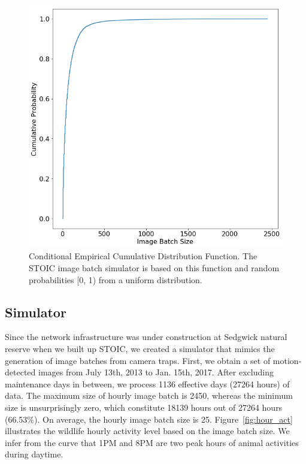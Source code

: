  
\begin{figure}[t] \centering 
\includegraphics[scale=0.36]{figures/ecdf.png}
\caption{Conditional Empirical Cumulative Distribution Function. The STOIC image batch simulator is based on this function and random probabilities [0, 1) from a uniform distribution.
\label{fig:cecdf}}
\end{figure} 
 
\subsection{Simulator}

Since the network infrastructure was under construction at Sedgwick natural reserve when we built up STOIC, we created a simulator that mimics the generation of image batches from camera traps. First, we obtain a set of motion-detected images from July 13th, 2013 to Jan. 15th, 2017. After excluding maintenance days in between, we process 1136 effective days (27264 hours) of data. The maximum size of hourly image batch is 2450, whereas the minimum size is unsurprisingly zero, which constitute 18139 hours out of 27264 hours (66.53\%). On average, the hourly image batch size is 25. Figure~\ref{fig:hour_act} illustrates the wildlife hourly activity level based on the image batch size. We infer from the curve that 1PM and 8PM are two peak hours of animal activities during daytime. 

